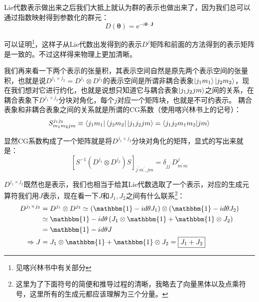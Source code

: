 Lie代数表示做出来之后我们大抵上就认为群的表示也做出来了，因为我们总可以通过指数映射得到参数化的群元：
\begin{equation}
	D(\mathbf{\theta})=\mathrm{e}^{-i\mathbf{\theta}\cdot\mathbf{J}}
\end{equation}

可以证明\footnote{见喀兴林书中有关部分}，这样子从Lie代数出发得到的表示$D^j$矩阵和前面的方法得到的表示矩阵是一致的。不过这样得来物理上更加清晰。

我们再来看一下两个表示的张量积，其表示空间自然是原先两个表示空间的张量积，也就是说$D^{j_1\times j_2}=D^{j_1}\otimes D^{j_2}$的表示空间是所谓非耦合表象$\ket{j_1m_1}\ket{j_2m_2}$，现在我们想对它进行约化，也就是说想只知道它与耦合表象$\ket{j_1j_2jm}$之间的关系，在耦合表象下$D^{j_1\times j_2}$分块对角化，每个$j$对应一个矩阵块，也就是不可约表示。
耦合表象和非耦合表象之间的关系就是所谓的CG系数（使用喀兴林书上的记号）：
\begin{equation}
	S_{m_1m_2jm}^{j_1j_2}\equiv \bra{j_1m_1}\bra{j_2m_2}\ket{j_1j_2jm}=\braket{j_1j_2m_1m_2|jm}
\end{equation}

显然CG系数构成了一个矩阵就是将$D^{j_1\times j_2}$分块对角化的矩阵，显式的写出来就是：
\begin{equation}
	\left[S^{-1}(D^{j_1}\otimes D^{j_2})S\right]_{j^\prime m^\prime,jm}=\delta_{jj^\prime }D^{j}_{m^\prime m}
\end{equation}

$D^{j_1\times j_2}$既然也是表示，我们也相当于给其Lie代数选取了一个表示，对应的生成元算符我们用$J$表示，现在看一下$J$和$J_1,J_2$之间有什么联系\footnote{这里为了下面符号的简便和推导过程的清晰，我略去了向量黑体以及点乘符号，这里所有的生成元都应该理解为三个分量。}：
\begin{equation}
	\begin{aligned}
		D^{j_1\times j_2}&=D^{j_1}\otimes D^{j_2}\simeq\left(\mathbbm{1}-id\theta J_1\right)\otimes\left(\mathbbm{1}-id\theta J_2\right)\\
		&\simeq\mathbbm{1}-id\theta\left( J_1\otimes \mathbbm{1}+\mathbbm{1}\otimes J_2\right)\\
		&=\mathbbm{1}-id\theta J\\
		\Rightarrow J&= J_1\otimes \mathbbm{1}+\mathbbm{1}\otimes J_2=\boxed{J_1+J_2}
	\end{aligned}
\end{equation}

